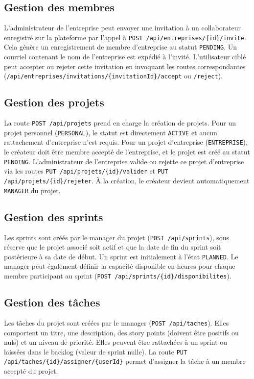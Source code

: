 \documentclass[12pt,a4paper]{report}
\begin{document}
\subsection{Gestion des membres}
L'administrateur de l'entreprise peut envoyer une invitation à un collaborateur enregistré sur la plateforme par l'appel à \verb|POST /api/entreprises/{id}/invite|. Cela génère un enregistrement de membre d'entreprise au statut \verb|PENDING|. Un courriel contenant le nom de l'entreprise est expédié à l'invité. L'utilisateur ciblé peut accepter ou rejeter cette invitation en invoquant les routes correspondantes (\verb|/api/entreprises/invitations/{invitationId}/accept| ou \verb|/reject|).

\subsection{Gestion des projets}
La route \verb|POST /api/projets| prend en charge la création de projets. Pour un projet personnel (\verb|PERSONAL|), le statut est directement \verb|ACTIVE| et aucun rattachement d'entreprise n'est requis. Pour un projet d'entreprise (\verb|ENTREPRISE|), le créateur doit être membre accepté de l'entreprise, et le projet est créé au statut \verb|PENDING|. L'administrateur de l'entreprise valide ou rejette ce projet d'entreprise via les routes \verb|PUT /api/projets/{id}/valider| et \verb|PUT /api/projets/{id}/rejeter|. À la création, le créateur devient automatiquement \verb|MANAGER| du projet.

\subsection{Gestion des sprints}
Les sprints sont créés par le manager du projet (\verb|POST /api/sprints|), sous réserve que le projet associé soit actif et que la date de fin du sprint soit postérieure à sa date de début. Un sprint est initialement à l'état \verb|PLANNED|.
Le manager peut également définir la capacité disponible en heures pour chaque membre participant au sprint (\verb|POST /api/sprints/{id}/disponibilites|).

\subsection{Gestion des tâches}
Les tâches du projet sont créées par le manager (\verb|POST /api/taches|). Elles comportent un titre, une description, des story points (doivent être positifs ou nuls) et un niveau de priorité. Elles peuvent être rattachées à un sprint ou laissées dans le backlog (valeur de sprint nulle). La route \verb|PUT /api/taches/{id}/assigner/{userId}| permet d'assigner la tâche à un membre accepté du projet.
\end{document}
